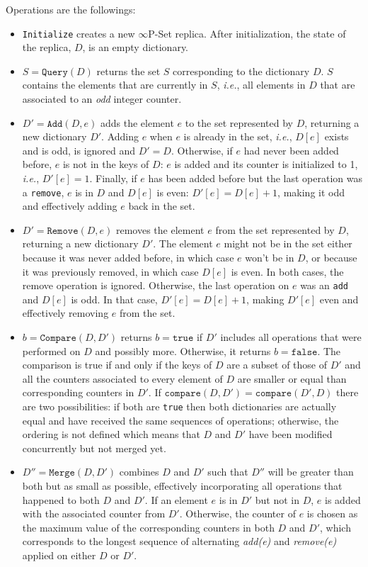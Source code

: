 \documentclass[11pt, oneside]{article}   	%
\begin{document}
Operations are the followings:
\begin{itemize}

	\item \texttt{Initialize} creates a new $\infty$P-Set replica. After initialization, the state of the replica, $D$, is an empty dictionary. 

	\item $S=\texttt{Query}(D)$ returns the set $S$ corresponding to the dictionary $D$. $S$ contains the elements that are currently in $S$, \textit{i.e.}, all elements in $D$ that are associated to an \textit{odd} integer counter.

	\item $D'=\texttt{Add}(D,e)$ adds the element $e$ to the set represented by $D$, returning a new dictionary $D'$.  Adding $e$ when $e$ is already in the set, \textit{i.e.}, $D[e]$ exists and is odd, is ignored and $D'=D$. Otherwise, if $e$ had never been added before, $e$ is not in the keys of $D$: $e$ is added and its counter is initialized to 1, \textit{i.e.}, $D'[e] = 1$. Finally, if $e$ has been added before but the last operation was a \texttt{remove}, $e$ is in $D$ and $D[e]$ is even: $D'[e] = D[e] + 1$, making it odd and effectively adding $e$ back in the set.

\item $D'=\texttt{Remove}(D, e)$ removes the element $e$ from the set represented by $D$, returning a new dictionary $D'$. The element $e$ might not be in the set either because it was never added before, in which case $e$ won't be in $D$, or because it was previously removed, in which case $D[e]$ is even. In both cases, the remove operation is ignored. Otherwise, the last operation on $e$ was an \texttt{add} and $D[e]$ is odd. In that case, $D'[e]=D[e]+1$, making $D'[e]$ even and effectively removing $e$ from the set.

\item $b=\texttt{Compare}(D, D')$ returns $b=\texttt{true}$ if $D'$ includes all operations that were performed on $D$ and possibly more. Otherwise, it returns $b=\texttt{false}$. The comparison is true if and only if the keys of $D$ are a subset of those of $D'$ and all the counters associated to every element of $D$ are smaller or equal than corresponding counters in $D'$. If $\texttt{compare}(D,D')= \texttt{compare}(D',D)$ there are two possibilities: if both are \texttt{true} then both dictionaries are actually equal and have received the same sequences of operations; otherwise, the ordering is not defined which means that $D$ and $D'$ have been modified concurrently but not merged yet.

\item $D''=\texttt{Merge}(D, D')$ combines $D$ and $D'$ such that $D''$ will be greater than both but as small as possible, effectively incorporating all operations that happened to both $D$ and $D'$. If an element $e$ is  in $D'$ but not in $D$, $e$ is added with the associated counter from $D'$. Otherwise, the counter of $e$ is chosen as the maximum value of the corresponding counters in both $D$ and $D'$, which corresponds to the longest sequence of alternating \textit{add(e)} and \textit{remove(e)} applied on either $D$ or $D'$.
\end{itemize}
\end{document}
